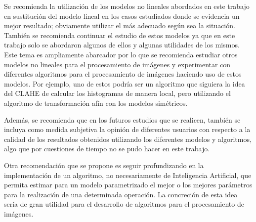 \begin{recomendations}
    Se recomienda la utilizaci\'on de los modelos no lineales abordados en este trabajo en sustituci\'on del modelo lineal en los casos estudiados donde se evidencia un mejor resultado; obviamente utilizar el m\'as adecuado seg\'un sea la situaci\'on. Tambi\'en se recomienda continuar el estudio de estos modelos ya que en este trabajo solo se abordaron algunos de ellos y algunas utilidades de los mismos. Este tema es ampliamente abarcador por lo que se recomienda estudiar otros modelos no lineales para el procesamiento de im\'agenes y experimentar con diferentes algoritmos para el procesamiento de im\'agenes haciendo uso de estos modelos. Por ejemplo, uno de estos podr\'ia ser un algoritmo que siguiera la idea del CLAHE de calcular los histogramas de manera local, pero utilizando el algoritmo de transformaci\'on af\'in con los modelos sim\'etricos.
    
    Adem\'as, se recomienda que en los futuros estudios que se realicen, tambi\'en se incluya como medida subjetiva la opini\'on de diferentes usuarios con respecto a la calidad de los resultados obtenidos utilizando los diferentes modelos y algoritmos, algo que por cuestiones de tiempo no se pudo hacer en este trabajo.
    
    Otra recomendaci\'on que se propone es seguir profundizando en la implementaci\'on de un algoritmo, no necesariamente de Inteligencia Artificial, que permita estimar para un modelo parametrizado el mejor o los mejores par\'ametros para la realizaci\'on de una determinada operaci\'on. La concreci\'on de esta idea ser\'ia de gran utilidad para el desarrollo de algoritmos para el procesamiento de im\'agenes.
    
    
\end{recomendations}

